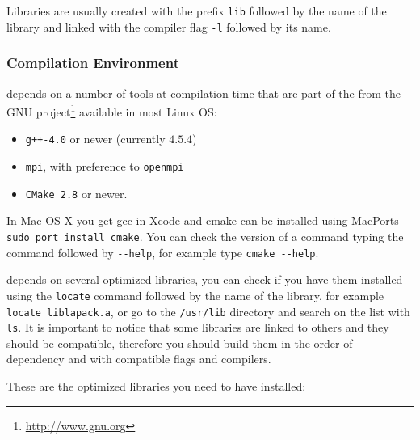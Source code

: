 Libraries are usually created with the prefix \verb!lib! followed by the name of the library
and linked with the compiler flag \verb!-l! followed by its name. 

\subsubsection{Compilation Environment}
\label{sec:comp-envir}

\lifev depends on a number of tools at compilation time that are part
of the  from the GNU project\footnote{\url{http://www.gnu.org}} 
available in most Linux OS:

\begin{itemize}
\item \verb!g++-4.0! or newer (currently $4.5.4$)%
\item \verb!mpi!, with preference to \verb!openmpi!
\item \verb!CMake 2.8! or newer.
\end{itemize}

In Mac OS X you get gcc in Xcode and cmake can be 
installed using MacPorts \verb!sudo port install cmake!. You can check the version of a command typing the command followed by \verb!--help!, 
for example type \verb!cmake --help!. 

\lifev depends on several optimized libraries, you can check if you have them installed 
using the \verb!locate! command followed by the name of the library, for example 
\verb!locate liblapack.a!, or go to the \verb!/usr/lib! directory and search on the 
list with \verb!ls!. 
It is important to notice that some libraries are linked to others and they should 
be compatible, therefore you should build them in the order of dependency and with 
compatible flags and compilers. 

These are the optimized libraries you need to have installed:

